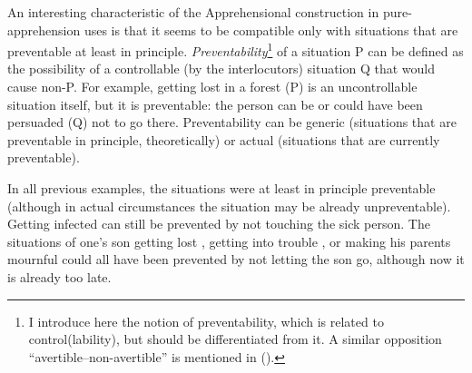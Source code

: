\documentclass[output=paper,colorlinks,citecolor=brown
]{langscibook}
\begin{document}
\z



\z

 An interesting characteristic of the Apprehensional construction in pure\hyp apprehension uses is that it seems to be compatible only with situations that are preventable at least in principle. \textit{Preventability}\footnote{I introduce here the notion of preventability, which is related to control(lability), but should be differentiated from it. A similar opposition ``avertible--non-avertible'' is mentioned in \citeauthor{lichtenberk1995} (\citeyear[311]{lichtenberk1995}).} of a situation P can be defined as the possibility of a controllable (by the interlocutors) situation Q that would cause non-P. For example, getting lost in a forest (P) is an uncontrollable situation itself, but it is preventable: the person can be or could have been persuaded (Q) not to go there. Preventability can be generic (situations that are preventable in principle, theoretically) or actual (situations that are currently preventable).

In all previous examples, the situations were at least in principle preventable (although in actual circumstances the situation may be already unpreventable). Getting infected  can still be prevented by not touching the sick person. The situations of one's son getting lost , getting into trouble , or making his parents mournful  could all have been prevented by not letting the son go, although now it is already too late.
\end{document}
